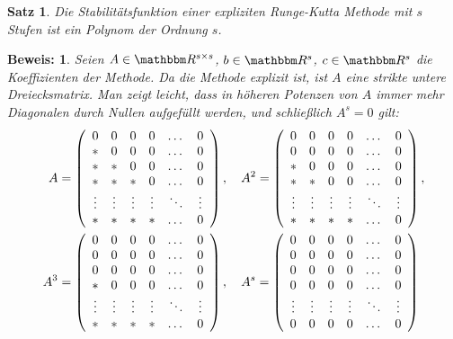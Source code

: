 \documentclass[12pt,a4paper]{book}
\theoremstyle{break}
\newtheorem{theorem}{Satz}[chapter]
\theoremstyle{nonumberplain}
\newtheorem{beweis}{Beweis:}
\newcommand{\R}{\mathbbm R}
\newcommand{\1}{\mathbbm{1}} 			      	%
\begin{document}
\begin{theorem}\label{thm:expl_RK_polynomial}
Die Stabilitätsfunktion einer expliziten Runge-Kutta Methode mit $s$ Stufen ist ein Polynom der Ordnung $s$.
\end{theorem}
\begin{beweis}
Seien $A\in \R^{s\times s}$, $b\in \R^s$, $c\in \R^s$ die Koeffizienten der Methode. 
Da die Methode explizit ist, ist $A$ eine strikte untere Dreiecksmatrix. Man zeigt leicht, 
dass in höheren Potenzen von $A$ immer mehr Diagonalen durch Nullen aufgefüllt werden, und
schließlich $A^s=0$ gilt:
\begin{align*}
A&=\left( \begin{array}{c c c c c c}
0 & 0 & 0 & 0 & \dots & 0\\
* & 0 & 0 & 0 & \dots & 0\\
* & * & 0 & 0 & \dots & 0\\
* & * & * & 0 & \dots & 0\\
\vdots & \vdots & \vdots & \vdots & \ddots & \vdots\\
* & * & * & * &  \dots & 0\\
\end{array}\right), \quad
A^2=\left( \begin{array}{c c c c c c}
0 & 0 & 0 & 0 & \dots & 0\\
0 & 0 & 0 & 0 & \dots & 0\\
* & 0 & 0 & 0 & \dots & 0\\
* & * & 0 & 0 & \dots & 0\\
\vdots & \vdots & \vdots & \vdots & \ddots & \vdots\\
* & * & * & * &  \dots & 0\\
\end{array}\right),\\
A^3&=\left( \begin{array}{c c c c c c}
0 & 0 & 0 & 0 & \dots & 0\\
0 & 0 & 0 & 0 & \dots & 0\\
0 & 0 & 0 & 0 & \dots & 0\\
* & 0 & 0 & 0 & \dots & 0\\
\vdots & \vdots & \vdots & \vdots & \ddots & \vdots\\
* & * & * & * &  \dots & 0\\
\end{array}\right), \quad
A^s=\left( \begin{array}{c c c c c c}
0 & 0 & 0 & 0 & \dots & 0\\
0 & 0 & 0 & 0 & \dots & 0\\
0 & 0 & 0 & 0 & \dots & 0\\
0 & 0 & 0 & 0 & \dots & 0\\
\vdots & \vdots & \vdots & \vdots & \ddots & \vdots\\
0 & 0 & 0 & 0 &  \dots & 0\\
\end{array}\right)
\end{align*}


\end{beweis}
\end{document}
